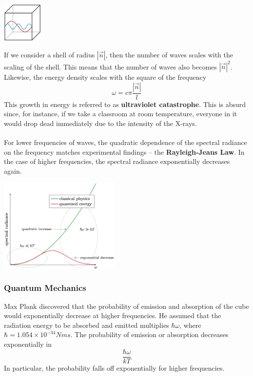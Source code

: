 \documentclass{article}
\begin{document}
\begin{center}
	\includegraphics[width=2cm]{assets/standing_waves.png}
\end{center}
If we consider a shell of radius $|\overrightarrow n|$, then the number of waves scales with the scaling of the shell. This means that the number of waves also becomes $|\overrightarrow n|^2$. Likewise, the energy density scales with the square of the frequency
\[ \omega = c \pi \displaystyle\frac{|\overrightarrow n|}{l} \]
This growth in energy is referred to as \textbf{ultraviolet catastrophe}. This is absurd since, for instance, if we take a classroom at room temperature, everyone in it would drop dead immediately due to the intensity of the X-rays. \\ \\
For lower frequencies of waves, the quadratic dependence of the spectral radiance on the frequency matches experimental findings -- the \textbf{Rayleigh-Jeans Law}. In the case of higher frequencies, the spectral radiance exponentially decreases again.

\begin{center}
	\includegraphics[width=6cm]{assets/spectral_radiance.png}
\end{center}
\subsubsection{Quantum Mechanics}
Max Plank discovered that the probability of emission and absorption of the cube would exponentially decrease at higher frequencies. He assumed that the radiation energy to be absorbed and emitted multiplies $\hbar \omega$, where $\hbar = 1.054 \times 10^{-34}Nms$. The probability of emission or absorption decreases exponentially in
\[ \frac{\hbar \omega}{kT} \]
In particular, the probability falls off exponentially for higher frequencies.
\end{document}
